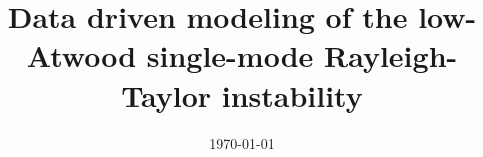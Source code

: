 \documentclass[a4paper, 11pt, oneside]{Thesis}  %
\begin{document}
\frontmatter      %

\title  {Data driven modeling of the low-Atwood single-mode Rayleigh-Taylor instability}
\addresses  {\groupname\\\deptname\\\univname}  %
\date       {\today}
\subject    {}
\keywords   {}

\maketitle


\fancyhead{}  %
\rhead{\thepage}  %
\lhead{}  %

\pagestyle{fancy}  %
\end{document}

